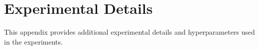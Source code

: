 \chapter{Experimental Details}
\label{app:experimental_details}

This appendix provides additional experimental details and hyperparameters used in the experiments.
